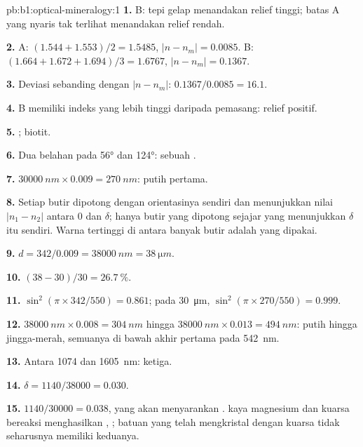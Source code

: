 \begin{solution}{pb:b1:optical-mineralogy:1}
\textbf{1.} B: tepi gelap menandakan relief tinggi; batas A yang nyaris tak terlihat menandakan relief rendah.

\textbf{2.} A: $(1.544 + 1.553)/2 = 1.5485$, $|n - n_m| = 0.0085$. B:
$(1.664 + 1.672 + 1.694)/3 = 1.6767$, $|n - n_m| = 0.1367$.

\textbf{3.} Deviasi sebanding dengan $|n - n_m|$: $0.1367/0.0085 =
16.1$.

\textbf{4.} B memiliki indeks yang lebih tinggi daripada pemasang: relief positif.

\textbf{5.} ; biotit.

\textbf{6.} Dua belahan pada \ang{56} dan \ang{124}: sebuah .

\textbf{7.} $\qty{30000}{nm}\times0.009 = \qty{270}{nm}$: putih  pertama.

\textbf{8.} Setiap butir dipotong dengan orientasinya sendiri dan menunjukkan nilai $|n_1 - n_2|$ antara 0 dan $\delta$; hanya butir yang dipotong sejajar  yang menunjukkan $\delta$ itu sendiri. Warna tertinggi di antara banyak butir adalah yang dipakai.

\textbf{9.} $d = 342/0.009 = \qty{38000}{nm} = \qty{38}{\micro m}$.

\textbf{10.} $(38 - 30)/30 = \qty{26.7}{\percent}$.

\textbf{11.} $\sin^2(\pi\times342/550) = 0.861$; pada \qty{30}{\micro m},
$\sin^2(\pi\times270/550) = 0.999$.

\textbf{12.} $\qty{38000}{nm}\times0.008 = \qty{304}{nm}$ hingga
$\qty{38000}{nm}\times0.013 = \qty{494}{nm}$: putih hingga jingga-merah, semuanya di bawah akhir  pertama pada \qty{542}{nm}.

\textbf{13.} Antara 1074 dan \qty{1605}{nm}:  ketiga.

\textbf{14.} $\delta = 1140/38000 = 0.030$.

\textbf{15.} $1140/30000 = 0.038$, yang akan menyarankan .  kaya magnesium dan kuarsa bereaksi menghasilkan ,
; batuan yang telah mengkristal dengan kuarsa tidak seharusnya memiliki keduanya.


\end{solution}

